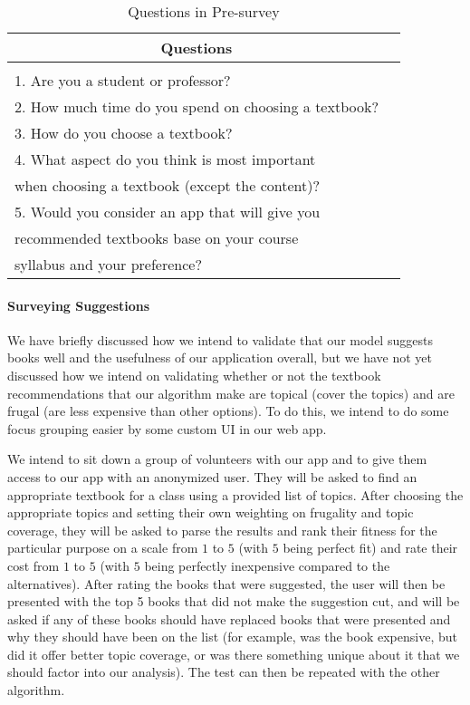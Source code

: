 \begin{table}[ht] 
\caption{Questions in Pre-survey}
\label{Pre-survey}
\begin{center}
\begin{tabular}{ll}
\multicolumn{1}{c}{\bf Questions} 
\\ \hline \\
1. Are you a student or professor?\\
2. How much time do you spend on choosing a textbook?\\
3. How do you choose a textbook?\\
4. What aspect do you think is most important\\
when choosing a textbook (except the content)? \\
5. Would you consider an app that will give you \\
recommended textbooks base on your course \\
syllabus and your preference? \\
\end{tabular}
\end{center}
\end{table} 

\paragraph{Surveying Suggestions}
We have briefly discussed how we intend to validate that our model suggests books well and the usefulness of our application overall, but we have not yet discussed how we intend on validating whether or not the textbook recommendations that our algorithm make are topical (cover the topics) and are frugal (are less expensive than other options).  
To do this, we intend to do some focus grouping easier by some custom UI in our web app.

We intend to sit down a group of volunteers with our app and to give them access to our app with an anonymized user.  
They will be asked to find an appropriate textbook for a class using a provided list of topics.  
After choosing the appropriate topics and setting their own weighting on frugality and topic coverage, they will be asked to parse the results and rank their fitness for the particular purpose on a scale from $1$ to $5$ (with $5$ being perfect fit) and rate their cost from $1$ to $5$ (with $5$ being perfectly inexpensive compared to the alternatives).  
After rating the books that were suggested, the user will then be presented with the top 5 books that did not make the suggestion cut, and will be asked if any of these books should have replaced books that were presented and why they should have been on the list (for example, was the book expensive, but did it offer better topic coverage, or was there something unique about it that we should factor into our analysis).  
The test can then be repeated with the other algorithm.

